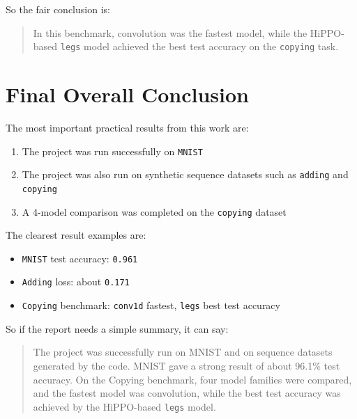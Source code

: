 \documentclass[12pt]{article}
\begin{document}
So the fair conclusion is:

\begin{quote}
In this benchmark, convolution was the fastest model, while the HiPPO-based \texttt{legs} model achieved the best test accuracy on the \texttt{copying} task.
\end{quote}

\section*{Final Overall Conclusion}

The most important practical results from this work are:

\begin{enumerate}
    \item The project was run successfully on \texttt{MNIST}
    \item The project was also run on synthetic sequence datasets such as \texttt{adding} and \texttt{copying}
    \item A 4-model comparison was completed on the \texttt{copying} dataset
\end{enumerate}

The clearest result examples are:

\begin{itemize}
    \item \texttt{MNIST} test accuracy: \texttt{0.961}
    \item \texttt{Adding} loss: about \texttt{0.171}
    \item \texttt{Copying} benchmark: \texttt{conv1d} fastest, \texttt{legs} best test accuracy
\end{itemize}

So if the report needs a simple summary, it can say:

\begin{quote}
The project was successfully run on MNIST and on sequence datasets generated by the code. MNIST gave a strong result of about 96.1\% test accuracy. On the Copying benchmark, four model families were compared, and the fastest model was convolution, while the best test accuracy was achieved by the HiPPO-based \texttt{legs} model.
\end{quote}
\end{document}
